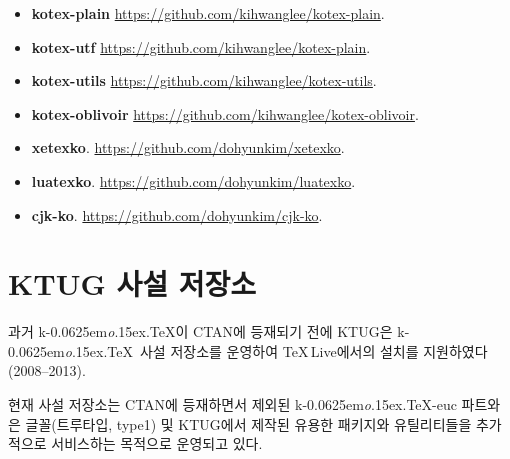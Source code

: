 \documentclass[a4paper,%
	10.5pt,%
	amsmath,%
	chapter,%
	twoside,%
	openany,%
	finemath,%
	oldfontcommands]%
{oblivoir}
\newcommand*\kotex{\texorpdfstring{\textsf{k}\kern-0.0625em\textit{o}\kern-1.5pt\lower.15ex\hbox{.}\kern-1pt\protect\TeX}{ko.TeX}}
\def\pkg#1{\textsf{#1}\index{Packages!#1}}
\begin{document}
\begin{itemize} \oblivoirlist
\item \textbf{kotex-plain} \url{https://github.com/kihwanglee/kotex-plain}.
\item \textbf{kotex-utf} \url{https://github.com/kihwanglee/kotex-plain}.
\item \textbf{kotex-utils} \url{https://github.com/kihwanglee/kotex-utils}.
\item \textbf{kotex-oblivoir} \url{https://github.com/kihwanglee/kotex-oblivoir}.
\item \textbf{xetexko}. \url{https://github.com/dohyunkim/xetexko}.
\item \textbf{luatexko}. \url{https://github.com/dohyunkim/luatexko}.
\item \textbf{cjk-ko}. \url{https://github.com/dohyunkim/cjk-ko}.
\end{itemize}

\section{KTUG 사설 저장소}

과거 \kotex 이 CTAN에 등재되기 전에 KTUG은 \kotex\ 사설 저장소를 운영하여 \TeX\,Live에서의 설치를 지원하였다(2008--2013).

현재 사설 저장소는 CTAN에 등재하면서 제외된 \kotex-euc 파트와 은 글꼴(트루타입, type1) 및 KTUG에서 제작된 유용한 패키지와 유틸리티들을 추가적으로 서비스하는 목적으로 운영되고 있다. 

\end{document}
